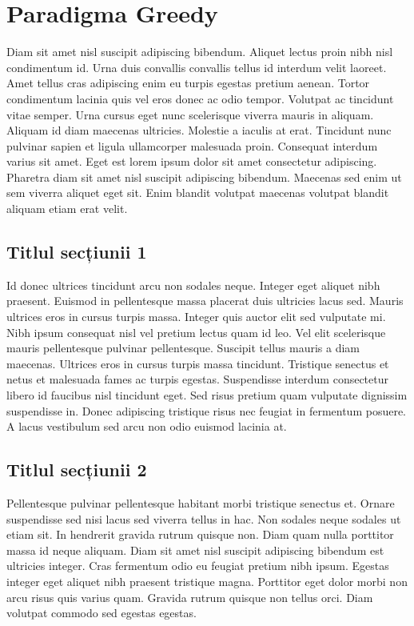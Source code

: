 \chapter{Paradigma Greedy}

Diam sit amet nisl suscipit adipiscing bibendum. Aliquet lectus proin nibh nisl condimentum id. Urna duis convallis convallis tellus id interdum velit laoreet. Amet tellus cras adipiscing enim eu turpis egestas pretium aenean. Tortor condimentum lacinia quis vel eros donec ac odio tempor. Volutpat ac tincidunt vitae semper. Urna cursus eget nunc scelerisque viverra mauris in aliquam. Aliquam id diam maecenas ultricies. Molestie a iaculis at erat. Tincidunt nunc pulvinar sapien et ligula ullamcorper malesuada proin. Consequat interdum varius sit amet. Eget est lorem ipsum dolor sit amet consectetur adipiscing. Pharetra diam sit amet nisl suscipit adipiscing bibendum. Maecenas sed enim ut sem viverra aliquet eget sit. Enim blandit volutpat maecenas volutpat blandit aliquam etiam erat velit.

\section{Titlul secțiunii 1}

Id donec ultrices tincidunt arcu non sodales neque. Integer eget aliquet nibh praesent. Euismod in pellentesque massa placerat duis ultricies lacus sed. Mauris ultrices eros in cursus turpis massa. Integer quis auctor elit sed vulputate mi. Nibh ipsum consequat nisl vel pretium lectus quam id leo. Vel elit scelerisque mauris pellentesque pulvinar pellentesque. Suscipit tellus mauris a diam maecenas. Ultrices eros in cursus turpis massa tincidunt. Tristique senectus et netus et malesuada fames ac turpis egestas. Suspendisse interdum consectetur libero id faucibus nisl tincidunt eget. Sed risus pretium quam vulputate dignissim suspendisse in. Donec adipiscing tristique risus nec feugiat in fermentum posuere. A lacus vestibulum sed arcu non odio euismod lacinia at.

\section{Titlul secțiunii 2}

Pellentesque pulvinar pellentesque habitant morbi tristique senectus et. Ornare suspendisse sed nisi lacus sed viverra tellus in hac. Non sodales neque sodales ut etiam sit. In hendrerit gravida rutrum quisque non. Diam quam nulla porttitor massa id neque aliquam. Diam sit amet nisl suscipit adipiscing bibendum est ultricies integer. Cras fermentum odio eu feugiat pretium nibh ipsum. Egestas integer eget aliquet nibh praesent tristique magna. Porttitor eget dolor morbi non arcu risus quis varius quam. Gravida rutrum quisque non tellus orci. Diam volutpat commodo sed egestas egestas.